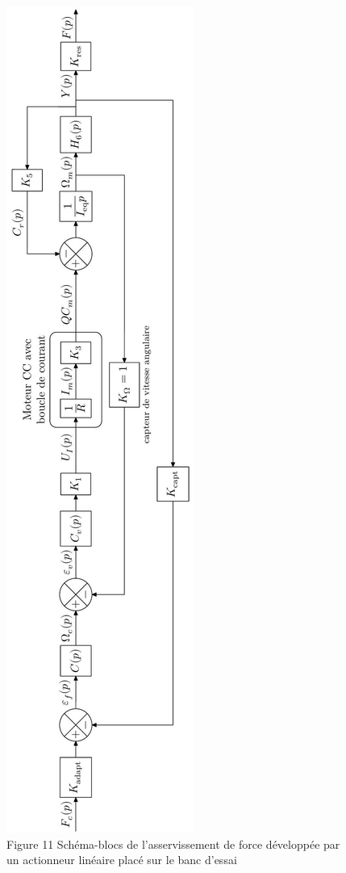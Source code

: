 \documentclass[10pt]{article}
\begin{document}
\begin{figure}[h]
\begin{center}
  \includegraphics[width=\textwidth]{2025_09_16_5f2d7643f7e649c6833dg-09}
\captionsetup{labelformat=empty}
\caption{Figure 11 Schéma-blocs de l'asservissement de force développée par un actionneur linéaire placé sur le banc d'essai}
\end{center}
\end{figure}
\end{document}
